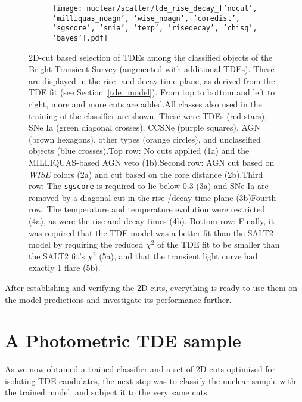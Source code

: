 \begin{figure}[htbp]
\begin{subfigure}[b]{0.49\textwidth}
  \end{subfigure}
  \begin{subfigure}[b]{0.49\textwidth}
    \centering
    \texttt{[image: nuclear/scatter/tde\_rise\_decay\_['nocut', 'milliquas\_noagn', 'wise\_noagn', 'coredist', 'sgscore', 'snia', 'temp', 'risedecay', 'chisq', 'bayes'].pdf]}
  \end{subfigure}
  \caption[BTS selection]{2D-cut based selection of TDEs among the classified objects of the Bright Transient Survey (augmented with additional TDEs). These are displayed in the rise- and decay-time plane, as derived from the TDE fit (see Section~\ref{tde_model}). From top to bottom and left to right, more and more cuts are added.\newline \newline All classes also used in the training of the classifier are shown. These were TDEs (red stars), SNe Ia (green diagonal crosses), CCSNe (purple squares), AGN (brown hexagons), other types (orange circles), and unclassified objects (blue crosses).\newline \newline Top row: No cuts applied (1a) and the MILLIQUAS-based AGN veto (1b).\newline \newline Second row: AGN cut based on \textit{WISE} colors (2a) and cut based on the core distance (2b).\newline \newline Third row: The \texttt{sgscore} is required to lie below 0.3 (3a) and SNe Ia are removed by a diagonal cut in the rise-/decay time plane (3b)\newline \newline Fourth row: The temperature and temperature evolution were restricted (4a), as were the rise and decay times (4b). \newline \newline Bottom row: Finally, it was required that the TDE model was a better fit than the SALT2 model by requiring the reduced $\chi^2$ of the TDE fit to be smaller than the SALT2 fit's $\chi^2$ (5a), and that the transient light curve had exactly 1 flare (5b).}
\end{figure}

After establishing and verifying the 2D cuts, everything is ready to use them on the model predictions and investigate its performance further.

\section{A Photometric TDE sample}
As we now obtained a trained classifier and a set of 2D cuts optimized for isolating TDE candidates, the next step was to classify the nuclear sample with the trained model, and subject it to the very same cuts.

